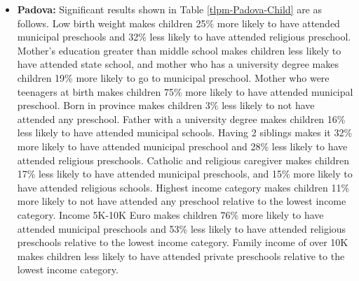 \documentclass[12pt]{article}
\begin{document}
\begin{itemize}
\item \textbf{Padova:} Significant results shown in Table \ref{tlpm-Padova-Child} are as follows. Low birth weight makes children 25\% more likely to have attended municipal preschools and 32\% less likely to have attended religious preschool. Mother's education greater than middle school makes children less likely to have attended state school, and mother who has a university degree makes children 19\% more likely to go to municipal preschool. Mother who were teenagers at birth makes children 75\% more likely to have attended municipal preschool. Born in province makes children 3\% less likely to not have attended any preschool. Father with a university degree makes children 16\% less likely to have attended municipal schools. Having 2 siblings makes it 32\% more likely to have attended municipal preschool and 28\% less likely to have attended religious preschools. Catholic and religious caregiver makes children 17\% less likely to have attended municipal preschools, and 15\% more likely to have attended religious schools. Highest income category makes children 11\% more likely to not have attended any preschool relative to the lowest income category. Income 5K-10K Euro makes children 76\% more likely to have attended municipal preschools and 53\% less likely to have attended religious preschools relative to the lowest income category. Family income of over 10K makes children less likely to have attended private preschools relative to the lowest income category.
\end{itemize}
\end{document}
